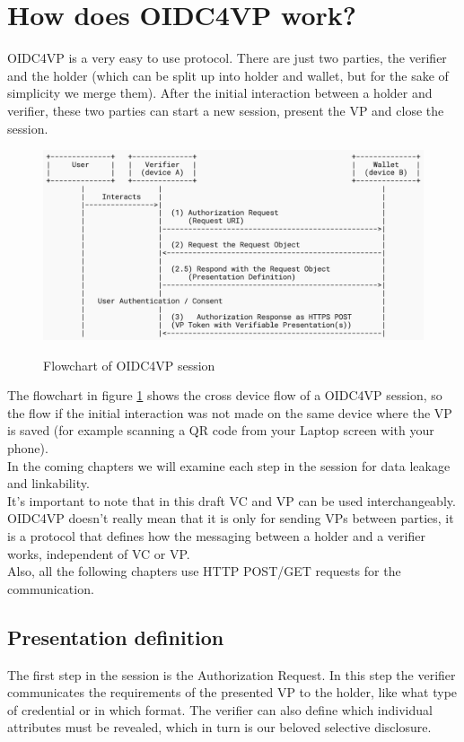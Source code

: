 \documentclass[
	a4paper               %
	,BCOR=0mm            %
	,bibliography=totoc   %
	,listof=totoc         %
	,monolingual
	,twoside=false
]{bfhthesis}              %
\begin{document}
\section{How does OIDC4VP work?}
OIDC4VP is a very easy to use protocol.
There are just two parties, the verifier and the holder (which can be split up into holder and wallet, but for the sake of simplicity we merge them).
After the initial interaction between a holder and verifier, these two parties can start a new session, present the VP and close the session.

\begin{figure}[h]
	\centering
	\includegraphics[width=12cm]{./img/oidc4vpflow.png}
	\label{fig:flowvp}
	\caption{Flowchart of OIDC4VP session}
\end{figure}

The flowchart in figure \ref{fig:flowvp} shows the cross device flow of a OIDC4VP session, so the flow if the initial interaction was not made on the same device where the VP is saved (for example scanning a QR code from your Laptop screen with your phone).\\
In the coming chapters we will examine each step in the session for data leakage and linkability.\\
It's important to note that in this draft VC and VP can be used interchangeably.
OIDC4VP doesn't really mean that it is only for sending VPs between parties, it is a protocol that defines how the messaging between a holder and a verifier works, independent of VC or VP.\\
Also, all the following chapters use HTTP POST/GET requests for the communication.

\subsection{Presentation definition}
\label{subsec:presdef}
The first step in the session is the Authorization Request. 
In this step the verifier communicates the requirements of the presented VP to the holder, like what type of credential or in which format.
The verifier can also define which individual attributes must be revealed, which in turn is our beloved selective disclosure.
\end{document}
